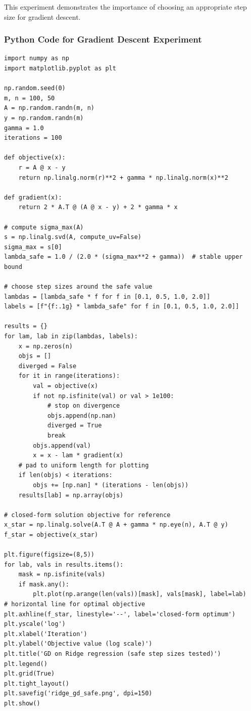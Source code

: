 \documentclass[11pt]{article}
\begin{document}
This experiment demonstrates the importance of choosing an appropriate step size for gradient descent.

\subsubsection*{Python Code for Gradient Descent Experiment}

\begin{verbatim}
import numpy as np
import matplotlib.pyplot as plt

np.random.seed(0)
m, n = 100, 50
A = np.random.randn(m, n)
y = np.random.randn(m)
gamma = 1.0
iterations = 100

def objective(x):
    r = A @ x - y
    return np.linalg.norm(r)**2 + gamma * np.linalg.norm(x)**2

def gradient(x):
    return 2 * A.T @ (A @ x - y) + 2 * gamma * x

# compute sigma_max(A)
s = np.linalg.svd(A, compute_uv=False)
sigma_max = s[0]
lambda_safe = 1.0 / (2.0 * (sigma_max**2 + gamma))  # stable upper bound

# choose step sizes around the safe value
lambdas = [lambda_safe * f for f in [0.1, 0.5, 1.0, 2.0]]
labels = [f"{f:.1g} * lambda_safe" for f in [0.1, 0.5, 1.0, 2.0]]

results = {}
for lam, lab in zip(lambdas, labels):
    x = np.zeros(n)
    objs = []
    diverged = False
    for it in range(iterations):
        val = objective(x)
        if not np.isfinite(val) or val > 1e100:
            # stop on divergence
            objs.append(np.nan)
            diverged = True
            break
        objs.append(val)
        x = x - lam * gradient(x)
    # pad to uniform length for plotting
    if len(objs) < iterations:
        objs += [np.nan] * (iterations - len(objs))
    results[lab] = np.array(objs)

# closed-form solution objective for reference
x_star = np.linalg.solve(A.T @ A + gamma * np.eye(n), A.T @ y)
f_star = objective(x_star)

plt.figure(figsize=(8,5))
for lab, vals in results.items():
    mask = np.isfinite(vals)
    if mask.any():
        plt.plot(np.arange(len(vals))[mask], vals[mask], label=lab)
# horizontal line for optimal objective
plt.axhline(f_star, linestyle='--', label='closed-form optimum')
plt.yscale('log')
plt.xlabel('Iteration')
plt.ylabel('Objective value (log scale)')
plt.title('GD on Ridge regression (safe step sizes tested)')
plt.legend()
plt.grid(True)
plt.tight_layout()
plt.savefig('ridge_gd_safe.png', dpi=150)
plt.show()
\end{verbatim}
\end{document}
